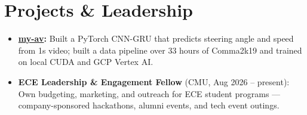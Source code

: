 \documentclass[11pt, letterpaper]{article}
\begin{document}
\section{Projects \& Leadership}
\begin{itemize}
  \item \textbf{\href{https://github.com/lordphone/my-av}{my-av}:} Built a PyTorch CNN-GRU that predicts steering angle and speed from 1s video; built a data pipeline over 33 hours of Comma2k19 and trained on local CUDA and GCP Vertex AI.
  \item \textbf{ECE Leadership \& Engagement Fellow} (CMU, Aug 2026 -- present): Own budgeting, marketing, and outreach for ECE student programs --- company-sponsored hackathons, alumni events, and tech event outings.
\end{itemize}
\end{document}
